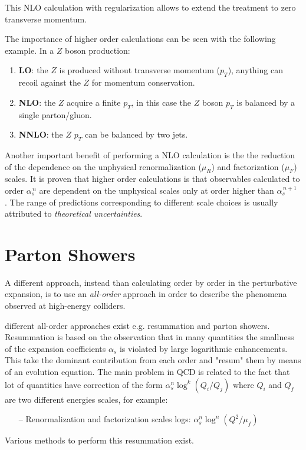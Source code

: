 This NLO calculation with regularization allows to extend the treatment to zero transverse momentum.

The importance of higher order calculations can be seen with the following example. In a $Z$ boson production:
\begin{enumerate}[label=$\arabic*)$]
	\item \textbf{LO}: the $Z$ is produced without transverse momentum ($p_T$), anything can recoil against the $Z$ for momentum conservation.
	\item \textbf{NLO}: the $Z$ acquire a finite $p_T$, in this case the $Z$ boson $p_T$ is balanced by a single \mbox{parton/gluon}.
	\item  \textbf{NNLO}: the $Z$ $p_T$ can be balanced by two jets. 
\end{enumerate}



Another important benefit of performing a NLO calculation is the the reduction of the dependence on the unphysical renormalization ($\mu_R$) and factorization ($\mu_F$) scales.
It is proven that higher order calculations is that observables calculated to order $\alpha_s^{\,n}$ are dependent on the unphysical scales only at order higher than $\alpha_s^{\,n+1}$ \cite{Campbell2006}. The range of predictions corresponding to different scale choices is usually attributed to \textit{theoretical uncertainties}.

\section{Parton Showers}

A different approach, instead than calculating order by order in the perturbative expansion, is to use an \textit{all-order} approach in order to describe the phenomena observed at high-energy colliders. 

different all-order approaches exist e.g. resummation and parton showers. Resummation is based on the observation that in many quantities the smallness of the expansion coefficients $\alpha_s$ is violated by large logarithmic enhancements. This take the dominant contribution from each order and "resum" them by means of an evolution equation. 
The main problem in QCD is related to the fact that lot of quantities have correction of the form $\alpha_s^n\log^k(Q_i/Q_j)$ where $Q_i$ and $Q_f$ are two different energies scales, for example:
\begin{itemize}
	\item[--] Renormalization and factorization scales logs: $\alpha_s^n\log^n(Q^2/\mu_f)$
\end{itemize}
Various methods to perform this resummation exist.

